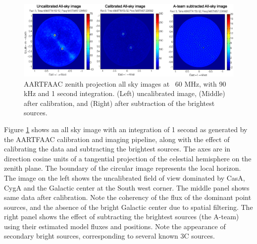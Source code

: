 \documentclass{aa}
\begin{document}
\begin{figure}[t]
\includegraphics[width=1\textwidth]{Figs/uncal_cal_deconv_night.eps}
\caption{AARTFAAC zenith projection  all sky images at ~60  MHz, with 90 kHz
  and  1   second  integration.   (Left)  uncalibrated  image,   (Middle)  after
  calibration, and (Right) after subtraction of the brightest sources.}
\label{fig:uncal_cal_deconv_night}
\end{figure}

Figure  \ref{fig:uncal_cal_deconv_night}   shows  an  all  sky   image  with  an
integration of  1 second  as generated by  the AARTFAAC calibration  and imaging
pipeline,  along with the  effect of  calibrating the  data and  subtracting the
brightest  sources.  The  axes are  in direction  cosine units  of  a tangential
projection of the celestial hemisphere on the zenith plane.  The boundary of the
circular image  represents the local  horizon. The image  on the left  shows the
uncalibrated field  of view dominated by  CasA, CygA and the  Galactic center at
the South west corner. The middle panel shows same data after calibration.  Note
the coherency of the flux of the  dominant point sources, and the absence of the
bright  Galactic center due  to spatial  filtering.  The  right panel  shows the
effect of subtracting  the brightest sources (the A-team)  using their estimated
model fluxes  and positions.  Note  the appearance of secondary  bright sources,
corresponding to several known 3C sources.

 

\end{document}
